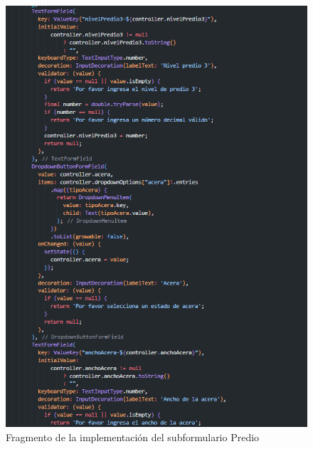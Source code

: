 \begin{figure}[h]
    \centering
    \includegraphics[scale=0.5]{Graphics/Capitulo 3/formulario_predio.png}
    \caption{Fragmento de la implementación del subformulario Predio} %
    \label{fig:figura17}
\end{figure}

